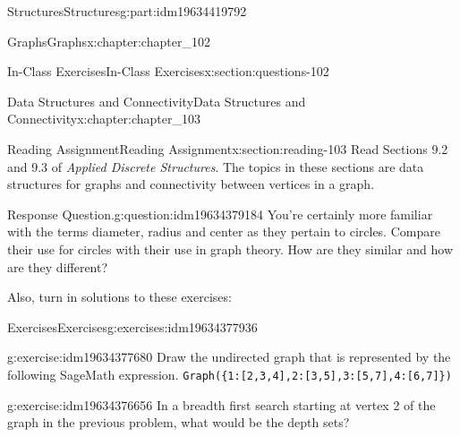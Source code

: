 \documentclass[oneside,10pt,]{book}
\newcommand{\mono}[1]{\texttt{#1}}
\numberwithin{equation}{section}
\begin{document}
\begin{partptx}{Structures}{}{Structures}{}{}{g:part:idm19634419792}
\begin{chapterptx}{Graphs}{}{Graphs}{}{}{x:chapter:chapter_102}
\begin{sectionptx}{In-Class Exercises}{}{In-Class Exercises}{}{}{x:section:questions-102}
\begin{enumerate}[label=\arabic*.]
\begin{enumerate}[label=(\alph*)]
\end{enumerate}
%
\end{enumerate}
%
\end{sectionptx}
\end{chapterptx}
%
\typeout{************************************************}
\typeout{************************************************}
%
\begin{chapterptx}{Data Structures and Connectivity}{}{Data Structures and Connectivity}{}{}{x:chapter:chapter_103}
\index{}%
%
%
\typeout{************************************************}
\typeout{************************************************}
%
\begin{sectionptx}{Reading Assignment}{}{Reading Assignment}{}{}{x:section:reading-103}
Read Sections 9.2 and 9.3 of \emph{Applied Discrete Structures}. The topics in these sections are data structures for graphs and connectivity between vertices in a graph.%
\begin{question}{Response Question.}{g:question:idm19634379184}%
You're certainly more familiar with the terms diameter, radius and center as they pertain to circles.  Compare their use for circles with their use in graph theory.   How are they similar and how are they different?%
\end{question}
Also, turn in solutions to these exercises:%
%
%
\typeout{************************************************}
\typeout{************************************************}
%
\begin{exercises-subsection-numberless}{Exercises}{}{Exercises}{}{}{g:exercises:idm19634377936}
\par\medskip\noindent%
%
\begin{exercisegroup}
\begin{divisionexerciseeg}{1}{}{}{g:exercise:idm19634377680}%
Draw the undirected graph that is represented by the following SageMath expression. \mono{Graph(\{1:[2,3,4],2:[3,5],3:[5,7],4:[6,7]\})}%
\end{divisionexerciseeg}%
\begin{divisionexerciseeg}{2}{}{}{g:exercise:idm19634376656}%
In a breadth first search starting at vertex 2 of the graph in the previous problem, what would be the depth sets?%
\end{divisionexerciseeg}%
\end{exercisegroup}
\par\medskip\noindent
\end{exercises-subsection-numberless}

\end{sectionptx}
\end{chapterptx}
\end{partptx}
\end{document}
